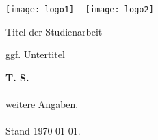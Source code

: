 \thispagestyle{empty}

\begin{flushright}
    \texttt{[image: logo1]}
    ~
    \texttt{[image: logo2]}

    \vfill

    \begin{Huge}
    Titel der Studienarbeit
    \end{Huge}

    \vspace{20pt}

    \begin{Large}
    ggf. Untertitel
    \end{Large}

    \vspace{5cm}

    \textbf{T. S.}\\
    ~\\
    weitere Angaben.\\
    ~\\
    Stand \today.

    \vspace{3cm}
\end{flushright}
